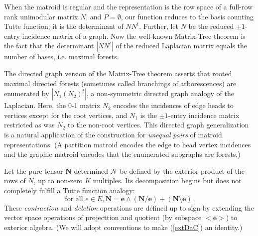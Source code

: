\documentclass[Unicode]{cedram-alco}
\begin{document}
When the matroid is regular and
the representation is the row space of a full-row rank unimodular matrix $N$, and $P=\emptyset$,
our function reduces to the basis counting Tutte function; it is the determinant
of $N N^t$.
Further, let $N$ be the reduced $\pm 1$-entry incidence matrix of a graph.
Now the well-known Matrix-Tree theorem
is the fact that the determinant $|N N^t|$ of the
reduced Laplacian matrix equals the number of bases, i.e. maximal forests.

The directed graph version of the Matrix-Tree theorem asserts that
rooted maximal directed forests
(sometimes called branchings of arborescences) are enumerated by
$|N_1 (N_2)^t|$, a non-symmetric directed graph analogy of the Laplacian.
Here, the 0-1 matrix $N_2$ encodes the incidences of edge heads to
vertices except for the root vertices, and $N_1$ is the $\pm 1$-entry incidence matrix
restricted as was $N_2$ to the non-root vertices.
This directed graph generalization 
is a natural application of the construction 
for \emph{unequal} \emph{pairs} of matroid representations.  (A partition matroid encodes the
edge to head vertex incidences and the graphic matroid encodes that the enumerated subgraphs
are forests.)




Let the pure tensor $\mathbf{N}$
determined $\mathcal{N}$ be defined
by the exterior product 
of the rows of $N$, up to non-zero $K$ multiples.  Its 
decomposition begins but does not completely fulfill a Tutte function analogy:
\begin{equation}\label{extDaC}
  \text{for all } e \in E, \mathbf{N} =
  \mathbf{e}\wedge(\mathbf{N}/\mathbf{e}) +
  (\mathbf{N}\setminus \mathbf{e}).
\end{equation}
These \emph{contraction} and \emph{deletion} operations are defined up to sign
by extending the vector space operations of projecttion and quotient
(by subspace $<\mathbf{e}>$) to exterior algebra.  (We will adopt comventions
to make (\ref{extDaC}) an identity.)




\end{document}
